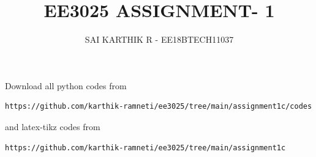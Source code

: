 \documentclass[journal,12pt,twocolumn]{IEEEtran}
\begin{document}
     \def\rightbox#1{\makebox[0in][r]{#1}}
     \def\centbox#1{\makebox[0in]{#1}}
     \def\topbox#1{\raisebox{-\baselineskip}[0in][0in]{#1}}
     \def\midbox#1{\raisebox{-0.5\baselineskip}[0in][0in]{#1}}
\vspace{3cm}
\title{EE3025 ASSIGNMENT- 1}
\author{SAI KARTHIK R - EE18BTECH11037}
\maketitle
\newpage
\bigskip
\renewcommand{\thefigure}{\theenumi}
\renewcommand{\thetable}{\theenumi}
Download all python codes from 
\begin{lstlisting}
https://github.com/karthik-ramneti/ee3025/tree/main/assignment1c/codes
\end{lstlisting}
%
and latex-tikz codes from 
%
\begin{lstlisting}
https://github.com/karthik-ramneti/ee3025/tree/main/assignment1c
\end{lstlisting}
\end{document}
